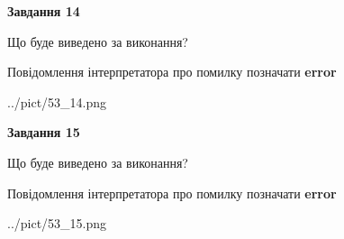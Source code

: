 \documentclass[11pt, ukrainian]{article}
\begin{document}
{\begin {large}
{\begin {center}\textbf{Завдання 14}\end {center}}\par
Що буде виведено за виконання? \par
Повідомлення інтерпретатора про помилку позначати \textbf{error}

\begin{center}
	{../pict/53_14.png}
\end{center}
\newpage

{\begin {center}\textbf{Завдання 15}\end {center}}\par
Що буде виведено за виконання? \par
Повідомлення інтерпретатора про помилку позначати \textbf{error}

\begin{center}
	{../pict/53_15.png}
\end{center}
\newpage

\end {large}}
\end{document}
